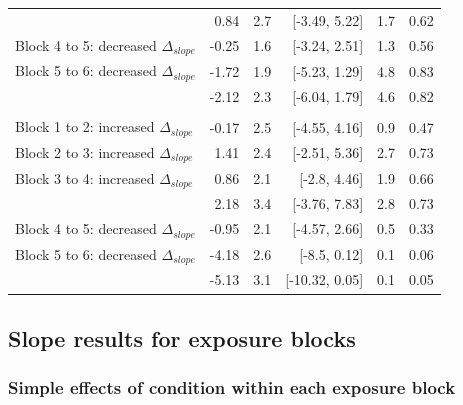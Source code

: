 \documentclass[
  11pt,
  man,mask,floatsintext]{apa6}
\begin{document}
\begin{table}[H]
\begin{tabular}[t]{>{\raggedright\arraybackslash}p{15em}rrrrr}
\hspace{1em}{\em Block 1 to 4: increased $\Delta_{slope}$} & 0.84 & 2.7 & {}[-3.49, 5.22] & 1.7 & 0.62\\
\hspace{1em}Block 4 to 5: decreased $\Delta_{slope}$ & -0.25 & 1.6 & {}[-3.24, 2.51] & 1.3 & 0.56\\
\hspace{1em}Block 5 to 6: decreased $\Delta_{slope}$ & -1.72 & 1.9 & {}[-5.23, 1.29] & 4.8 & 0.83\\
\hspace{1em}{\em Block 4 to 6: decreased $\Delta_{slope}$} & -2.12 & 2.3 & {}[-6.04, 1.79] & 4.6 & 0.82\\
\addlinespace[0.3em]
\multicolumn{6}{l}{\textbf{Difference in slopes: +40 vs. baseline}}\\
\hspace{1em}Block 1 to 2: increased $\Delta_{slope}$ & -0.17 & 2.5 & {}[-4.55, 4.16] & 0.9 & 0.47\\
\hspace{1em}Block 2 to 3: increased $\Delta_{slope}$ & 1.41 & 2.4 & {}[-2.51, 5.36] & 2.7 & 0.73\\
\hspace{1em}Block 3 to 4: increased $\Delta_{slope}$ & 0.86 & 2.1 & {}[-2.8, 4.46] & 1.9 & 0.66\\
\hspace{1em}{\em Block 1 to 4: increased $\Delta_{slope}$} & 2.18 & 3.4 & {}[-3.76, 7.83] & 2.8 & 0.73\\
\hspace{1em}Block 4 to 5: decreased $\Delta_{slope}$ & -0.95 & 2.1 & {}[-4.57, 2.66] & 0.5 & 0.33\\
\hspace{1em}Block 5 to 6: decreased $\Delta_{slope}$ & -4.18 & 2.6 & {}[-8.5, 0.12] & 0.1 & 0.06\\
\hspace{1em}{\em Block 4 to 6: decreased $\Delta_{slope}$} & -5.13 & 3.1 & {}[-10.32, 0.05] & 0.1 & 0.05\\
\bottomrule
\end{tabular}
\end{table}

\subsection{Slope results for exposure blocks}\label{sec:slopes-analyses-exposure}

\subsubsection{Simple effects of condition within each exposure block}\label{simple-effects-of-condition-within-each-exposure-block-1}
\end{document}
